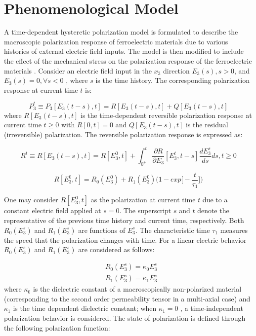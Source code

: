 \section{Phenomenological Model}
A time-dependent hysteretic polarization model is formulated to describe the macroscopic polarization response of ferroelectric materials
 due to various histories of external electric field inputs. 
The model is then modified to include the effect of the mechanical stress on the
 polarization response of the ferroelectric materials \cite{Muliana2011,Sohrabi201344}.
Consider an electric field input in the $x_3$ direction $E_3(s),s>0$,  and $E_3(s)=0,\forall s<0$  , where $s$ is the time history.  
The corresponding polarization response at current time $t$ is:

\begin{equation}
P_3^t\equiv P_3[E_3(t-s),t]=R[E_3(t-s),t]+Q[E_3(t-s),t]
\label{EQN:polarization_decomposition}
\end{equation}
where $R[E_3(t-s),t]$ is the time-dependent reversible polarization response at current time $t\geq 0$ with $R[0,t]=0$ and $Q[E_3(t-s),t]$ is the residual (irreversible) polarization. The reversible polarization response is expressed as:

\begin{equation}
\label{EQN:RevPol}
R^t\equiv R[E_3(t-s),t]= R[E_3^0,t]+\int_{0^+}^t\frac{\partial R}{\partial E_3} [E_3^t,t-s] \frac{dE_3^s}{ds}ds , t \geq 0
\end{equation}

\begin{equation}
R[E_3^0,t]=R_0(E_3^0)+R_1(E_3^0)\big(1-exp\bigg[-\frac{t}{\tau_1}\bigg] \big)
\label{EQN:StaticRevPol}
\end{equation}

One may consider $R[E_3^0,t]$ as the polarization at current time $t$ due to a constant electric field applied at $s=0$. 
The superscript $s$ and $t$ denote the representative of the previous time history and current time, respectively.
 Both $R_0(E_3^s)$ and $R_1(E_3^s)$ are functions of $E_3^s$. The characteristic time $\tau_1$ measures the speed that the polarization changes with time.
 For a linear electric behavior $R_0(E_3^s)$ and $R_1(E_3^s)$ are considered as follows:

\begin{equation}
\begin{aligned}
&R_0(E_3^s)=\kappa_0 E_3^s \\
&R_1(E_3^s)=\kappa_1 E_3^s
\end{aligned}
\label{EQN:R0R1Defini}
\end{equation}
where $\kappa_0$ is the dielectric constant of a macroscopically non-polarized material
 (corresponding to the second order permeability tensor in a multi-axial case) and $\kappa_1$ is the time dependent dielectric constant;
 when $\kappa_1=0$ ,
 a time-independent polarization behavior is considered. 
The state of polarization is defined through the following polarization function:
 
